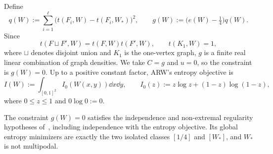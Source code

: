 Define
\[
  q(W):=\sum_{i=1}^\ell\bigl(t(F_i,W)-t(F_i,W_*)\bigr)^2,
  \qquad
  g(W):=\bigl(e(W)-\tfrac14\bigr)q(W).
\]
Since
\[
  t(F\sqcup F',W)=t(F,W)t(F',W),\qquad t(K_1,W)=1,
\]
where $\sqcup$ denotes disjoint union and $K_1$ is the one-vertex graph,
$g$ is a finite real linear combination of graph densities.
We take $C=g$ and $u=0$, so the constraint is $g(W)=0$.
Up to a positive constant factor, ARW's entropy objective is
\[
  I(W):=\int_{[0,1]^2}I_0(W(x,y))\dd x\dd y,
  \qquad I_0(z):=z\log z+(1-z)\log(1-z),
\]
where $0\le z\le1$ and $0\log0:=0$.

\begin{prop}\label{prop:arw-entropy-counterexample}
The constraint $g(W)=0$ satisfies the independence and non-extremal
regularity hypotheses of~\cite[Theorem~5.25]{AlvaradoRamonWang2026},
including independence with the entropy objective.  Its global
entropy minimizers are exactly the two isolated classes $[1/4]$ and
$[W_*]$, and $W_*$ is not multipodal.
\end{prop}

